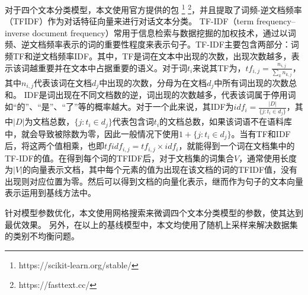 对于四个文本分类模型，本文使用官方提供的包 \footnote{https://scikit-learn.org/stable/} \footnote{https://fasttext.cc/}，并且提取了词频-逆文档频率（TFIDF）\cite{joachims1996probabilistic}作为对话特征向量来进行对话文本分类。
TF-IDF（term frequency–inverse document frequency）常用于信息检索与数据挖掘的加权技术，通过以词频、逆文档频率表示的词的重要性程度来表示句子。TF-IDF主要包含两部分：词频TF和逆文档频率IDF。其中，TF是词在文本中出现的次数，出现次数越多，表示该词越重要并在文本中占据重要的语义。对于词$t_i$来说其TF为，$tf_{i,j}=\frac{n_{i,j}}{\sum_k{n_{k,j}}}$，其中$n_{i,j}$代表该词在文档$d_j$中出现的次数，分母为在文档$d_j$中所有词出现的次数总和。
IDF是词出现在不同文档数的逆，词出现的次数越多，代表该词属于停用词如“的”、“是”、“了”等的概率越大。对于一个此来说，其IDF为$idf_{i}=\frac{|D|}{\{j:t_i \in d_j\}}$，其中$|D|$为文档总数，$\{j:t_i \in d_j\}$代表包含词$t_i$的文档总数，如果该词语不在语料库中，就会导致被除数为零，因此一般情况下使用$1+\{j:t_i \in d_j\}$。当有TF和IDF后，将这两个值相乘，也即$tfidf_{i,j}=tf_{i,j}\times idf_i$，就能得到一个词在文档集中的TF-IDF的值。在得到每个词的TFIDF后，对于文档集的词集合$V$，通常使用长度为$|V|$的向量表示文档，其中每个元素的值为出现在该文档的词的TFIDF值，没有出现则对应位置为零。然后可以得到文档的向量化表示，继而作为句子的文本向量表示运用到基线方法中。


针对模型参数优化，本文使用网格搜索来微调四个文本分类模型的参数，使其达到最优效果。
另外，在以上的基线模型中，本文均使用了随机上采样\cite{ling1998data}来解决数据集的类别不均衡问题。

